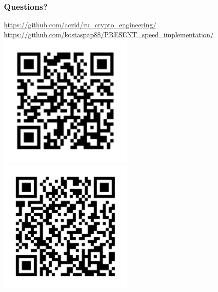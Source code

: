 \documentclass{beamer}
\begin{document}
\begin{frame}[fragile]
\frametitle{Questions?}
	\footnotesize{
	\url{https://github.com/aczid/ru_crypto_engineering/}
	\url{https://github.com/kostaspap88/PRESENT_speed_implementation/}
	}
	\includegraphics[width=0.5\textwidth]{qr_url}
	\includegraphics[width=0.5\textwidth]{qr_url2}
\end{frame}
\end{document}
